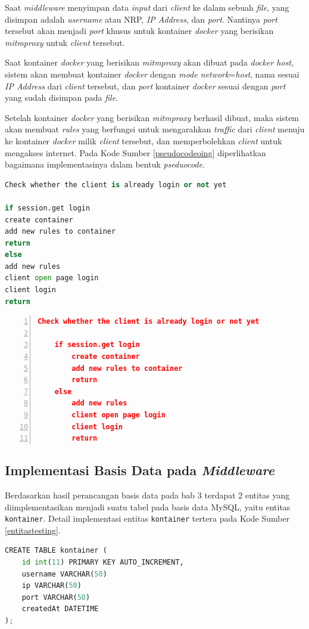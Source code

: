 Saat \textit{middleware} menyimpan data \textit{input} dari \textit{client} ke dalam sebuah \textit{file}, yang disimpan adalah \textit{username} atau NRP, \textit{IP Address}, dan \textit{port}. Nantinya \textit{port} tersebut akan menjadi \textit{port} khusus untuk kontainer \textit{docker} yang berisikan \textit{mitmproxy} untuk \textit{client} tersebut.

Saat kontainer \textit{docker} yang berisikan \textit{mitmproxy} akan dibuat pada \textit{docker host}, sistem akan membuat kontainer \textit{docker} dengan \textit{mode network}=\textit{host}, nama sesuai \textit{IP Address} dari \textit{client} tersebut, dan \textit{port} kontainer \textit{docker} sesuai dengan \textit{port} yang sudah disimpan pada \textit{file}.

Setelah kontainer \textit{docker} yang berisikan \textit{mitmproxy} berhasil dibuat, maka sistem akan membuat \textit{rules} yang berfungsi untuk mengarahkan \textit{traffic} dari \textit{client} menuju ke kontainer \textit{docker} milik \textit{client} tersebut, dan memperbolehkan \textit{client} untuk mengakses internet. Pada Kode Sumber \ref{pseudocodeoing} diperlihatkan bagaimana implementasinya dalam bentuk \textit{pseduocode}.
\newline
\begin{lstlisting}[frame=single,tabsize=2,breaklines,captionpos=b,caption=Perintah untuk \textit{Pull} Ubuntu,language=Python,label=pullubuntu]
Check whether the client is already login or not yet

if session.get login
create container
add new rules to container
return
else
add new rules
client open page login
client login
return  	
\end{lstlisting}
\begin{minipage}{\linewidth}  
	\begin{lstlisting}[numbers=left, frame=single,tabsize=2,breaklines,caption={Pseudocode Web Service},label=pseudocodeoing,language=json]
	Check whether the client is already login or not yet
	
	if session.get login
		create container
		add new rules to container
		return
	else
		add new rules
		client open page login
		client login
		return  	
	\end{lstlisting}
\end{minipage}

\subsection{Implementasi Basis Data pada \textit{Middleware}}
Berdasarkan hasil perancangan basis data pada bab 3 terdapat 2 entitas yang diimplementasikan menjadi suatu tabel pada basis data MySQL, yaitu entitas \texttt{kontainer}. Detail implementasi entitas \texttt{kontainer} tertera pada Kode Sumber \ref{entitastesting}.
\newline
\begin{lstlisting}[frame=single,tabsize=2,breaklines,captionpos=b,language=python, caption=\textit{Query} untuk membuat tabel testing,label=entitastesting]
CREATE TABLE kontainer (
	id int(11) PRIMARY KEY AUTO_INCREMENT,
	username VARCHAR(50)
	ip VARCHAR(50)
	port VARCHAR(50)
	createdAt DATETIME
);
\end{lstlisting}


